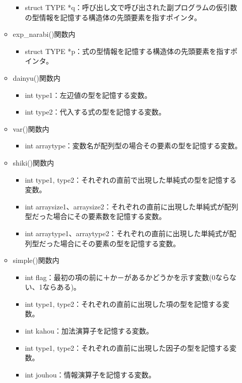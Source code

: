 \documentclass{jarticle}
\begin{document}
\begin{itemize}
\begin{itemize}
    \begin{itemize}
      \item struct TYPE *q：呼び出し文で呼び出された副プログラムの仮引数の型情報を記憶する構造体の先頭要素を指すポインタ。
    \end{itemize}
    \item exp\_narabi()関数内
    \begin{itemize}
      \item struct TYPE *p：式の型情報を記憶する構造体の先頭要素を指すポインタ。
    \end{itemize}
    \item dainyu()関数内
    \begin{itemize}
      \item int type1：左辺値の型を記憶する変数。
      \item int type2：代入する式の型を記憶する変数。
    \end{itemize}
    \item var()関数内
    \begin{itemize}
      \item int arraytype：変数名が配列型の場合その要素の型を記憶する変数。
    \end{itemize}
    \item shiki()関数内
    \begin{itemize}
      \item int type1, type2：それぞれの直前で出現した単純式の型を記憶する変数。
      \item int
      arraysize1、arraysize2：それぞれの直前に出現した単純式が配列型だった場合にその要素数を記憶する変数。
      \item int
      arraytype1、arraytype2：それぞれの直前に出現した単純式が配列型だった場合にその要素の型を記憶する変数。
    \end{itemize}
    \item simple()関数内
    \begin{itemize}
      \item int flag：最初の項の前に＋か－があるかどうかを示す変数(0ならない、1ならある)。
      \item int type1, type2：それぞれの直前に出現した項の型を記憶する変数。
      \item int kahou：加法演算子を記憶する変数。
    \end{itemize}
    \begin{itemize}
      \item int type1, type2：それぞれの直前に出現した因子の型を記憶する変数。
      \item int jouhou：情報演算子を記憶する変数。

\end{itemize}
\end{itemize}
\end{itemize}
\end{document}
